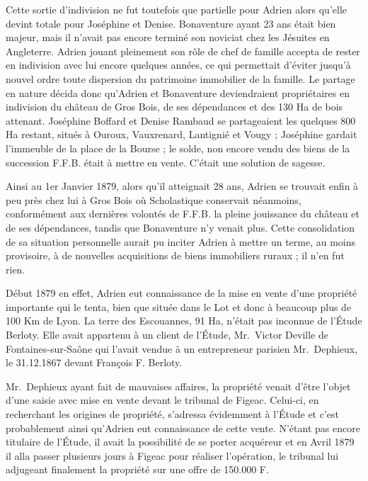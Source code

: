 \documentclass[11pt,a4paper]{report}
\begin{document}
Cette sortie d'indivision ne fut toutefois que partielle pour Adrien alors qu'elle devint totale pour Joséphine et Denise. Bonaventure ayant 23 ans était bien majeur, mais il n'avait pas encore terminé son noviciat chez les Jésuites en Angleterre. Adrien jouant pleinement son rôle de chef de famille accepta de rester en indivision avec lui encore quelques années, ce qui permettait d'éviter jusqu'à nouvel ordre toute dispersion du patrimoine immobilier de la famille. Le partage en nature décida donc qu'Adrien et Bonaventure deviendraient propriétaires en indivision du château de Gros Bois, de ses dépendances et des 130 Ha de bois attenant. Joséphine Boffard et Denise Rambaud se partageaient les quelques 800 Ha restant, situés à Ouroux, Vauxrenard, Lantignié et Vougy ; Joséphine gardait l'immeuble de la place de la Bourse ; le solde, non encore vendu des biens de la succession F.F.B. était à mettre en vente. C'était une solution de sagesse.

Ainsi au 1er Janvier 1879, alors qu'il atteignait 28 ans, Adrien se trouvait enfin à peu près chez lui à Gros Bois où Scholastique conservait néanmoins, conformément aux dernières volontés de F.F.B. la pleine jouissance du château et de ses dépendances, tandis que Bonaventure n'y venait plus. Cette consolidation de sa situation personnelle aurait pu inciter Adrien à mettre un terme, au moins provisoire, à de nouvelles acquisitions de biens immobiliers ruraux ; il n'en fut rien.

Début 1879 en effet, Adrien eut connaissance de la mise en vente d'une propriété importante qui le tenta, bien que située dans le Lot et donc à beaucoup plus de 100 Km de Lyon. La terre des Escouannes, 91 Ha, n'était pas inconnue de l'Étude Berloty. Elle avait appartenu à un client de l'Étude, Mr.~Victor Deville de Fontaines-sur-Saône qui l'avait vendue à un entrepreneur parisien Mr.~Dephieux, le 31.12.1867 devant François F. Berloty.


Mr.~Dephieux ayant fait de mauvaises affaires, la propriété venait d'être l'objet d'une saisie avec mise en vente devant le tribunal de Figeac. Celui-ci, en recherchant les origines de propriété, s'adressa évidemment à l'Étude et c'est probablement ainsi qu'Adrien eut connaissance de cette vente. N'étant pas encore titulaire de l'Étude, il avait la possibilité de se porter acquéreur et en Avril 1879 il alla passer plusieurs jours à Figeac pour réaliser l'opération, le tribunal lui adjugeant finalement la propriété sur une offre de 150.000 F.
\end{document}
